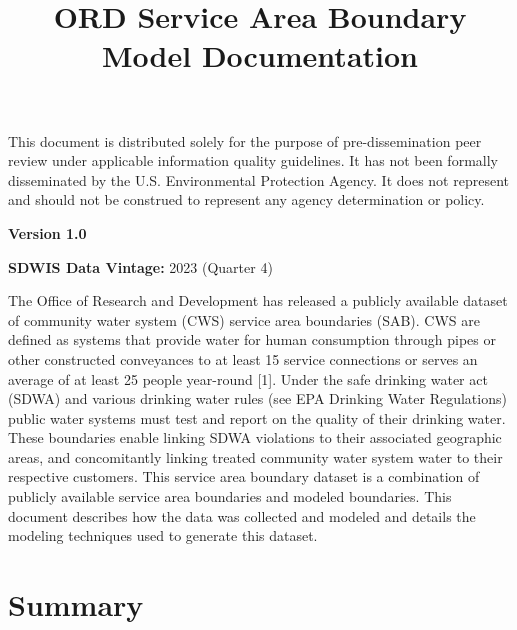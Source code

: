 \documentclass[
  letterpaper,
  DIV=11,
  numbers=noendperiod,
  oneside]{scrartcl}
\title{ORD Service Area Boundary Model Documentation}
\author{}
\date{}
\renewcommand*\contentsname{Table of contents}
\newcommand\contentsname{Table of contents}
\begin{document}
\maketitle

\renewcommand*\contentsname{Table of contents}
{
\hypersetup{linkcolor=}
\setcounter{tocdepth}{2}
\tableofcontents
}
\begin{tcolorbox}[enhanced jigsaw, bottomtitle=1mm, colbacktitle=quarto-callout-important-color!10!white, toptitle=1mm, leftrule=.75mm, breakable, colback=white, coltitle=black, bottomrule=.15mm, arc=.35mm, left=2mm, opacityback=0, opacitybacktitle=0.6, titlerule=0mm, rightrule=.15mm, colframe=quarto-callout-important-color-frame, title=\textcolor{quarto-callout-important-color}{\faExclamation}\hspace{0.5em}{Disclaimer}, toprule=.15mm]

This document is distributed solely for the purpose of pre-dissemination
peer review under applicable information quality guidelines. It has not
been formally disseminated by the U.S. Environmental Protection Agency.
It does not represent and should not be construed to represent any
agency determination or policy.

\end{tcolorbox}

\textbf{Version 1.0}

\textbf{SDWIS Data Vintage:} 2023 (Quarter 4)

The Office of Research and Development has released a publicly available
dataset of community water system (CWS) service area boundaries (SAB).
CWS are defined as systems that provide water for human consumption
through pipes or other constructed conveyances to at least 15 service
connections or serves an average of at least 25 people year-round
{[}1{]}. Under the safe drinking water act (SDWA) and various drinking
water rules (see EPA Drinking Water Regulations) public water systems
must test and report on the quality of their drinking water. These
boundaries enable linking SDWA violations to their associated geographic
areas, and concomitantly linking treated community water system water to
their respective customers. This service area boundary dataset is a
combination of publicly available service area boundaries and modeled
boundaries. This document describes how the data was collected and
modeled and details the modeling techniques used to generate this
dataset.

\section{Summary}\label{summary}
\end{document}
